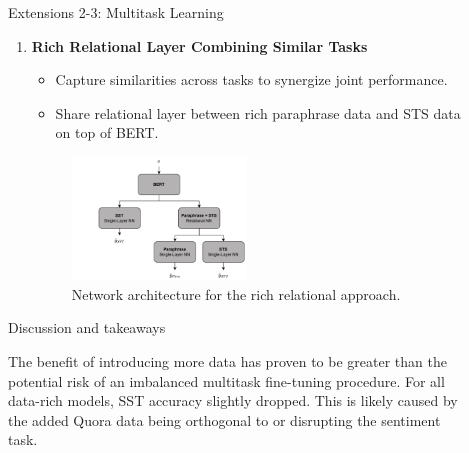 \documentclass[final]{beamer}
\newlength{\sepwidth}
\newlength{\colwidth}
\newcommand{\separatorcolumn}{\begin{column}{\sepwidth}\end{column}}
\begin{document}
\begin{frame}[t]
\begin{columns}[t]
\begin{column}{\colwidth}
\begin{block}{Extensions 2-3: Multitask Learning}
\begin{enumerate}
      \item \textbf{Rich Relational Layer Combining Similar Tasks} 
      \begin{itemize}
      \normalsize
          \item Capture similarities across tasks to synergize joint performance.
          \item Share relational layer between rich paraphrase data and STS data on top of BERT.
      \end{itemize}  
      \begin{figure}[h]
    \centering
    \includegraphics[width=0.485\textwidth]{writeup/rich-rel.png}
    \caption{Network architecture for the rich relational approach.}
\end{figure}
    \end{enumerate}
  \end{block}
\vspace{-1.2cm}
  \begin{alertblock}{\small Discussion and takeaways}
  \begin{outline}
      \1  The benefit of introducing more data has proven to be greater than the potential risk of an imbalanced multitask fine-tuning procedure.
      \1  For all data-rich models, SST accuracy slightly dropped. This is likely caused by the added Quora data being orthogonal to or disrupting the sentiment task.

  \end{outline}
     
  \end{alertblock}
\end{column}

\separatorcolumn

\begin{column}{\colwidth}


\end{column}
\end{columns}
\end{frame}
\end{document}
